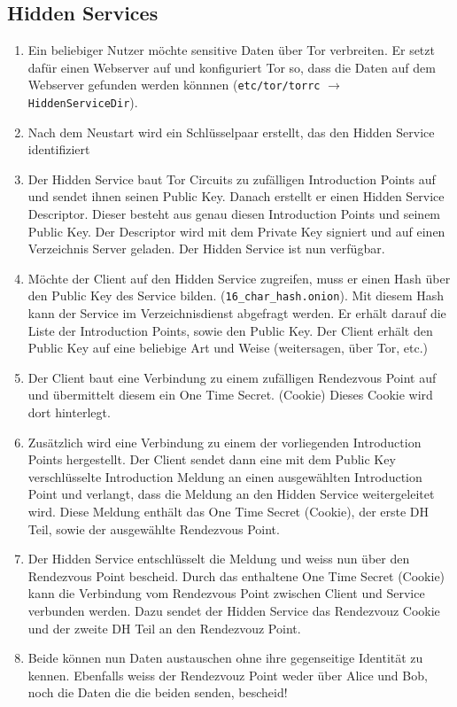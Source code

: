 \subsection{Hidden Services}
\begin{enumerate}
	\item Ein beliebiger Nutzer möchte sensitive Daten über Tor verbreiten. Er setzt dafür einen Webserver auf und konfiguriert Tor so, dass die Daten auf dem Webserver gefunden werden könnnen (\lstinline|etc/tor/torrc| $\rightarrow$ \lstinline|HiddenServiceDir|).
	\item Nach dem Neustart wird ein Schlüsselpaar erstellt, das den Hidden Service identifiziert
	\item Der Hidden Service baut Tor Circuits zu zufälligen Introduction Points auf und sendet ihnen seinen Public Key. Danach erstellt er einen Hidden Service Descriptor. Dieser besteht aus genau diesen Introduction Points und seinem Public Key. Der Descriptor wird mit dem Private Key signiert und auf einen Verzeichnis Server geladen. Der Hidden Service ist nun verfügbar.
	\item Möchte der Client auf den Hidden Service zugreifen, muss er einen Hash über den Public Key des Service bilden. (\lstinline|16_char_hash.onion|). Mit diesem Hash kann der Service im Verzeichnisdienst abgefragt werden. Er erhält darauf die Liste der Introduction Points, sowie den Public Key. Der Client erhält den Public Key auf eine beliebige Art und Weise (weitersagen, über Tor, etc.)
	\item Der Client baut eine Verbindung zu einem zufälligen Rendezvous Point auf und übermittelt diesem ein One Time Secret. (Cookie) Dieses Cookie wird dort hinterlegt.
	\item Zusätzlich wird eine Verbindung zu einem der vorliegenden Introduction Points hergestellt. Der Client sendet dann eine mit dem Public Key verschlüsselte Introduction Meldung an einen ausgewählten Introduction Point und verlangt, dass die Meldung an den Hidden Service weitergeleitet wird. Diese Meldung enthält das One Time Secret (Cookie), der erste DH Teil, sowie der ausgewählte Rendezvous Point. 
	\item Der Hidden Service entschlüsselt die Meldung und weiss nun über den Rendezvous Point bescheid. Durch das enthaltene One Time Secret (Cookie) kann die Verbindung vom Rendezvous Point zwischen Client und Service verbunden werden. Dazu sendet der Hidden Service das Rendezvouz Cookie und der zweite DH Teil an den Rendezvouz Point.
	\item Beide können nun Daten austauschen ohne ihre gegenseitige Identität zu kennen. Ebenfalls weiss der Rendezvouz Point weder über Alice und Bob, noch die Daten die die beiden senden, bescheid!
\end{enumerate}

